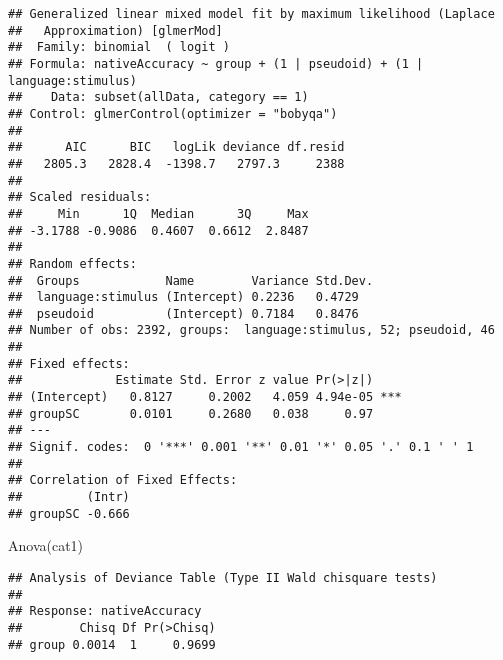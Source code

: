 \documentclass[
]{article}
\newenvironment{Shaded}{\begin{snugshade}}{\end{snugshade}}
\newcommand{\AttributeTok}[1]{\textcolor[rgb]{0.77,0.63,0.00}{#1}}
\newcommand{\DecValTok}[1]{\textcolor[rgb]{0.00,0.00,0.81}{#1}}
\newcommand{\FunctionTok}[1]{\textcolor[rgb]{0.00,0.00,0.00}{#1}}
\newcommand{\NormalTok}[1]{#1}
\newcommand{\OtherTok}[1]{\textcolor[rgb]{0.56,0.35,0.01}{#1}}
\newcommand{\SpecialCharTok}[1]{\textcolor[rgb]{0.00,0.00,0.00}{#1}}
\newcommand{\StringTok}[1]{\textcolor[rgb]{0.31,0.60,0.02}{#1}}
\begin{document}
\begin{verbatim}
## Generalized linear mixed model fit by maximum likelihood (Laplace
##   Approximation) [glmerMod]
##  Family: binomial  ( logit )
## Formula: nativeAccuracy ~ group + (1 | pseudoid) + (1 | language:stimulus)
##    Data: subset(allData, category == 1)
## Control: glmerControl(optimizer = "bobyqa")
## 
##      AIC      BIC   logLik deviance df.resid 
##   2805.3   2828.4  -1398.7   2797.3     2388 
## 
## Scaled residuals: 
##     Min      1Q  Median      3Q     Max 
## -3.1788 -0.9086  0.4607  0.6612  2.8487 
## 
## Random effects:
##  Groups            Name        Variance Std.Dev.
##  language:stimulus (Intercept) 0.2236   0.4729  
##  pseudoid          (Intercept) 0.7184   0.8476  
## Number of obs: 2392, groups:  language:stimulus, 52; pseudoid, 46
## 
## Fixed effects:
##             Estimate Std. Error z value Pr(>|z|)    
## (Intercept)   0.8127     0.2002   4.059 4.94e-05 ***
## groupSC       0.0101     0.2680   0.038     0.97    
## ---
## Signif. codes:  0 '***' 0.001 '**' 0.01 '*' 0.05 '.' 0.1 ' ' 1
## 
## Correlation of Fixed Effects:
##         (Intr)
## groupSC -0.666
\end{verbatim}

\begin{Shaded}
\begin{Highlighting}[]
\FunctionTok{Anova}\NormalTok{(cat1)}
\end{Highlighting}
\end{Shaded}

\begin{verbatim}
## Analysis of Deviance Table (Type II Wald chisquare tests)
## 
## Response: nativeAccuracy
##        Chisq Df Pr(>Chisq)
## group 0.0014  1     0.9699
\end{verbatim}

\begin{Shaded}
\end{Shaded}
\end{document}
